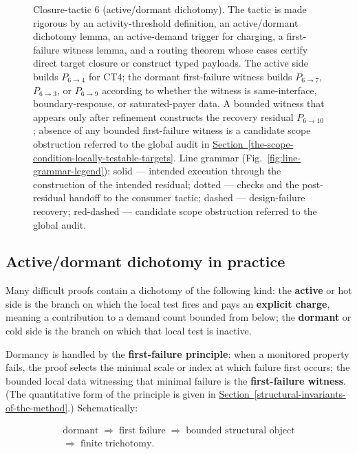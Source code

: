 \documentclass[
  11pt,
]{article}
\theoremstyle{definition}
\newcommand{\secref}[1]{\hyperref[#1]{Section~\ref*{#1}}}
\begin{document}
\begin{figure}[p]
{%
}
\caption[Closure-tactic 6: active/dormant dichotomy]{Closure-tactic 6 (active/dormant dichotomy).  The tactic is made rigorous by an activity-threshold definition, an active/dormant dichotomy lemma, an active-demand trigger for charging, a first-failure witness lemma, and a routing theorem whose cases certify direct target closure or construct typed payloads.  The active side builds \(P_{6\to4}\) for CT4; the dormant first-failure witness builds \(P_{6\to7}\), \(P_{6\to3}\), or \(P_{6\to9}\) according to whether the witness is same-interface, boundary-response, or saturated-payer data.  A bounded witness that appears only after refinement constructs the recovery residual \(P_{6\to10}\); absence of any bounded first-failure witness is a candidate scope obstruction referred to the global audit in \secref{the-scope-condition-locally-testable-targets}.  Line grammar (Fig.~\ref{fig:line-grammar-legend}): solid --- intended execution through the construction of the intended residual; dotted --- checks and the post-residual handoff to the consumer tactic; dashed --- design-failure recovery; red-dashed --- candidate scope obstruction referred to the global audit.}
\label{fig:ct6-active-dormant}
\end{figure}
\FloatBarrier

\subsection*{Active/dormant dichotomy in practice}

Many difficult proofs contain a dichotomy of the following kind:
the \textbf{active} or hot side is the branch on which the local test
fires and pays an \textbf{explicit charge}, meaning a contribution to a
demand count bounded from below; the \textbf{dormant} or cold side is
the branch on which that local test is inactive.

Dormancy is handled by the \textbf{first-failure principle}: when a
monitored property fails, the proof selects the minimal scale or index
at which failure first occurs; the bounded local data witnessing that
minimal failure is the \textbf{first-failure witness}. (The quantitative
form of the principle is given in \secref{structural-invariants-of-the-method}.) Schematically:

\[
\begin{gathered}
\text{dormant}
\;\Rightarrow\;
\text{first failure}
\;\Rightarrow\;
\text{bounded structural object}\\
\Rightarrow\;
\text{finite trichotomy}.
\end{gathered}
\]
\end{document}
